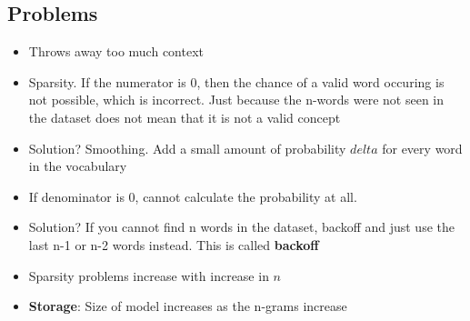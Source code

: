 \documentclass[a4paper]{article}
\begin{document}
\subsection{Problems}
\begin{itemize}
    \item Throws away too much context
    \item Sparsity. If the numerator is 0, then the chance of a valid word occuring is not possible, which is incorrect. Just because the n-words were not seen in the dataset does not mean that it is not a valid concept
    \item Solution? Smoothing. Add a small amount of probability $delta$ for every word in the vocabulary
    \item If denominator is 0, cannot calculate the probability at all.
    \item Solution? If you cannot find n words in the dataset, backoff and just use the last n-1 or n-2 words instead. This is called \textbf{backoff}  
    \item Sparsity problems increase with increase in $n$
    \item \textbf{Storage}: Size of model increases as the n-grams increase
\end{itemize}
\end{document}
